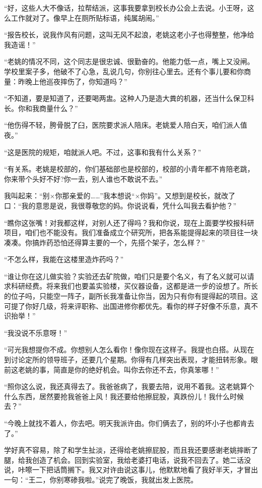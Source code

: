  “好，这些人大不像话，拉帮结派，这事我要拿到校长办公会上去说。小王呀，这么工作就对了。像早上在厕所贴标语，纯属胡闹。” 
 
 “报告校长，说我作风有问题，这叫无风不起浪，老姚这老小子也得整整，他净给我造谣！” 
 
 “老姚的情况不同，这个同志是很忠诚、很勤奋的。他能力低一点，嘴上又没闸。学校里案子多，他破不了心急，乱说几句，你别往心里去。还有个事儿要和你商量：昨晚上他巡夜摔伤了，你知道吗？” 
 
 “不知道，要是知道了，还要喝两盅。这种人乃是造大粪的机器，还当什么保卫科长。你和我商量什么？” 
 
 “他伤得不轻，胯骨脱了臼，医院要求派人陪床。老姚爱人陪白天，咱们派人值夜。” 
 
 “这是医院的规矩，咱就派人吧。不过，这事和我有什么关系？” 
 
 “有关系。老姚是校部的，你们基础部也是校部的，校部的小青年都不肯陪老跳，你来带个头好不好?你一去，别人谁也不敢说不去。” 
 
 我叫起来：“别×你那亲爱的……”我本想说“×你妈”。又想到是校长，就改了口：“我的意思是说，我很尊敬您的妈。你说说看，凭什么叫我去看护他？” 
 
 “瞧你这张嘴！对我都这样，对别人还了得吗？我和你说，现在上面要学校报科研项目，咱们也不能没有。我们准备成立个研究所，把各系能提得起来的项目往一块凑凑。你搞炸药恐怕还得算主要的一个，先搭个架子，怎么样？” 
 
 “不怎么样，我能在这楼里造炸药吗？” 
 
 “谁让你在这儿做实验？实验还去矿院做，咱们只是要个名义，有了名义就可以请求科研经费。将来我们也要盖实验楼，买仪器设备，这都是进一步的设想了。所长的位子吗，只能空一阵子，副所长我准备让你当，因为只有你有提得起的项目。这可提了你好几级，将来评职称、出国进修你都优先。看你的样子好像不乐意，真不识抬举！” 
 
 “我没说不乐意呀！” 
 
 “可光我想提你不成。你想别人怎么看你！像你现在这样子。我提也白搭。从现在到讨论定所的领导班子，还要几个星期。你得有几样突出表现，才能扭转形象。眼前这老姚的事，简直是你的绝好机会。叫你去你还不去，你真笨哪！” 
 
 “照你这么说，我还真得去了。我爸爸病了，我要去陪，说用不着我。这老姚算个什么东西，居然要抢我爸爸上风！我还要给他擦屁股，真跌份儿！我什么时候去？” 
 
 “今晚上就找不着人，你去吧。明天我派许由。你们俩去了，别的坏小子也都肯去了。” 
 
 学好真不容易，除了和学生扯淡，还得给老姚擦屁股，而且我还要感谢老姚摔断了腿，给我创造了机会。回到实验室，我给老婆打电话，说我不回去了。她二话没说，咔嚓一下把话筒搁下。我又对许由说这事儿，他默默地看了我好半天，才冒出一句：“王二，你别寒碜我啦。”说完了晚饭，我就出发上医院。 
 
